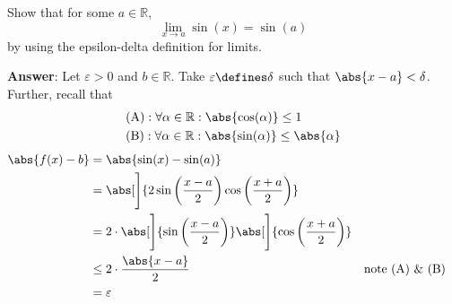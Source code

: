 \begin{exm}\label{exm-epsilon-delta-definition-limit:2}
    Show that for some $a\in\mathbb{R}$,
    \begin{equation*}
        \lim_{x\to a}\sin(x)=\sin(a)
    \end{equation*}
    by using the epsilon-delta definition for limits.
    \begin{flushleft}
        \textbf{Answer}: Let $\varepsilon>0$ and $b\in\mathbb{R}$. Take 
        $\varepsilon\defines\delta$ such that $\abs{x-a}<\delta$. Further, recall that
        \begin{align*}
            &\text{(A)}:\forall\alpha\in\mathbb{R}:\abs{\cos(\alpha)}\leq1\\
            &\text{(B)}:\forall\alpha\in\mathbb{R}:\abs{\sin(\alpha)}\leq\abs{\alpha}
        \end{align*}
        \begin{align*}
            \abs{f(x)-b}&=\abs{\sin(x)-\sin(a)}\\
                        &=\abs[\Bigg]{2\sin\left(\frac{x-a}{2}\right)\cos\left(\frac{x+a}{2}\right)}\\
                        &=2\cdot\abs[\Bigg]{\sin\left(\frac{x-a}{2}\right)}\abs[\Bigg]{\cos\left(\frac{x+a}{2}\right)}\\
                        &\leq 2\cdot\frac{\abs{x-a}}{2} && \text{note (A) \& (B)}\\
                        &=\varepsilon
        \end{align*}
    \end{flushleft}
\end{exm}

